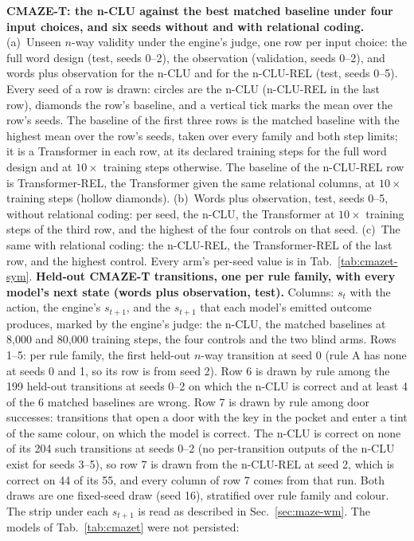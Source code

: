 \textbf{CMAZE-T: the n-CLU against the best matched baseline under four input choices, and six seeds without and with relational coding.} (a)~Unseen $n$-way validity under the engine's judge, one row per input choice: the full word design (test, seeds 0--2), the observation (validation, seeds 0--2), and words plus observation for the n-CLU and for the n-CLU-REL (test, seeds 0--5). Every seed of a row is drawn: circles are the n-CLU (n-CLU-REL in the last row), diamonds the row's baseline, and a vertical tick marks the mean over the row's seeds. The baseline of the first three rows is the matched baseline with the highest mean over the row's seeds, taken over every family and both step limits; it is a Transformer in each row, at its declared training steps for the full word design and at $10\times$ training steps otherwise. The baseline of the n-CLU-REL row is Transformer-REL, the Transformer given the same relational columns, at $10\times$ training steps (hollow diamonds). (b)~Words plus observation, test, seeds 0--5, without relational coding: per seed, the n-CLU, the Transformer at $10\times$ training steps of the third row, and the highest of the four controls on that seed. (c)~The same with relational coding: the n-CLU-REL, the Transformer-REL of the last row, and the highest control. Every arm's per-seed value is in Tab.~\ref{tab:cmazet-sym}.
\textbf{Held-out CMAZE-T transitions, one per rule family, with every model's next state (words plus observation, test).} Columns: $s_t$ with the action, the engine's $s_{t+1}$, and the $s_{t+1}$ that each model's emitted outcome produces, marked by the engine's judge: the n-CLU, the matched baselines at 8,000 and 80,000 training steps, the four controls and the two blind arms. Rows 1--5: per rule family, the first held-out $n$-way transition at seed 0 (rule A has none at seeds 0 and 1, so its row is from seed 2). Row 6 is drawn by rule among the 199 held-out transitions at seeds 0--2 on which the n-CLU is correct and at least 4 of the 6 matched baselines are wrong. Row 7 is drawn by rule among door successes: transitions that open a door with the key in the pocket and enter a tint of the same colour, on which the model is correct. The n-CLU is correct on none of its 204 such transitions at seeds 0--2 (no per-transition outputs of the n-CLU exist for seeds 3--5), so row 7 is drawn from the n-CLU-REL at seed 2, which is correct on 44 of its 55, and every column of row 7 comes from that run. Both draws are one fixed-seed draw (seed 16), stratified over rule family and colour. The strip under each $s_{t+1}$ is read as described in Sec.~\ref{sec:maze-wm}. The models of Tab.~\ref{tab:cmazet} were not persisted: 
